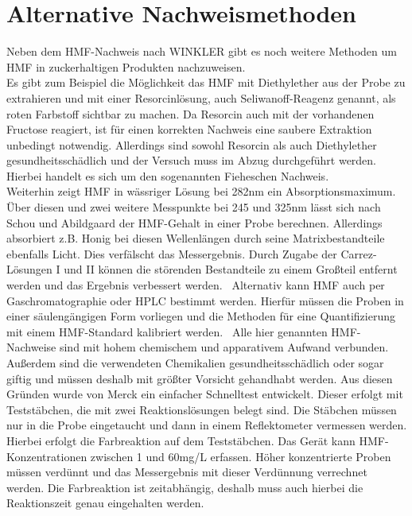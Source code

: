 \section{Alternative Nachweismethoden}

Neben dem HMF-Nachweis nach WINKLER gibt es noch weitere Methoden um HMF in zuckerhaltigen Produkten nachzuweisen.\\
Es gibt zum Beispiel die Möglichkeit das HMF mit Diethylether aus der Probe zu extrahieren und mit einer Resorcinlösung, auch Seliwanoff-Reagenz genannt, als roten Farbstoff sichtbar zu machen. Da Resorcin auch mit der vorhandenen Fructose reagiert, ist für einen korrekten Nachweis eine saubere Extraktion unbedingt notwendig. Allerdings sind sowohl Resorcin als auch Diethylether gesundheitsschädlich und der Versuch muss im Abzug durchgeführt werden.~\cite{Resorcinnachweis} Hierbei handelt es sich um den sogenannten Fieheschen Nachweis.~\cite{Winkler}\\
Weiterhin zeigt HMF in wässriger Lösung bei 282nm ein Absorptionsmaximum. Über diesen und zwei weitere Messpunkte bei 245 und 325nm lässt sich nach Schou und Abildgaard der HMF-Gehalt in einer Probe berechnen. Allerdings absorbiert z.B. Honig bei diesen Wellenlängen durch seine Matrixbestandteile ebenfalls Licht. Dies verfälscht das Messergebnis. Durch Zugabe der Carrez-Lösungen I und II können die störenden Bestandteile zu einem Großteil entfernt werden und das Ergebnis verbessert werden.~\cite{Winkler}
Alternativ kann HMF auch per Gaschromatographie oder HPLC bestimmt werden. Hierfür müssen die Proben in einer säulengängigen Form vorliegen und die Methoden für eine Quantifizierung mit einem HMF-Standard kalibriert werden.~\cite{Patent}
Alle hier genannten HMF-Nachweise sind mit hohem chemischem und apparativem Aufwand verbunden. Außerdem sind die verwendeten Chemikalien gesundheitsschädlich oder sogar giftig und müssen deshalb mit größter Vorsicht gehandhabt werden. Aus diesen Gründen wurde von Merck ein einfacher Schnelltest entwickelt. Dieser erfolgt mit Teststäbchen, die mit zwei Reaktionslösungen belegt sind. Die Stäbchen müssen nur in die Probe eingetaucht und dann in einem Reflektometer vermessen werden. Hierbei erfolgt die Farbreaktion auf dem Teststäbchen. Das Gerät kann HMF-Konzentrationen zwischen 1 und 60mg/L erfassen. Höher konzentrierte Proben müssen verdünnt und das Messergebnis mit dieser Verdünnung verrechnet werden. Die Farbreaktion ist zeitabhängig, deshalb muss auch hierbei die Reaktionszeit genau eingehalten werden.~\cite{Merck}

